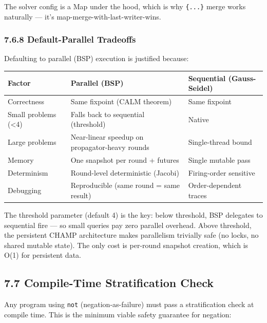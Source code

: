 \documentclass[11pt]{article}
\begin{document}
The solver config is a Map under the hood, which is why \texttt{\{...\}} merge
works naturally — it's map-merge-with-last-writer-wins.
\subsubsection{7.6.8 Default-Parallel Tradeoffs}
\label{sec:orgcf95be8}

Defaulting to parallel (BSP) execution is justified because:

\begin{center}
\begin{tabular}{lll}
Factor & Parallel (BSP) & Sequential (Gauss-Seidel)\\
\hline
Correctness & Same fixpoint (CALM theorem) & Same fixpoint\\
Small problems (<4) & Falls back to sequential (threshold) & Native\\
Large problems & Near-linear speedup on propagator-heavy rounds & Single-thread bound\\
Memory & One snapshot per round + futures & Single mutable pass\\
Determinism & Round-level deterministic (Jacobi) & Firing-order sensitive\\
Debugging & Reproducible (same round = same result) & Order-dependent traces\\
\end{tabular}
\end{center}

The threshold parameter (default 4) is the key: below threshold, BSP
delegates to sequential fire — so small queries pay zero parallel overhead.
Above threshold, the persistent CHAMP architecture makes parallelism trivially
safe (no locks, no shared mutable state). The only cost is per-round snapshot
creation, which is O(1) for persistent data.
\subsection{7.7 Compile-Time Stratification Check}
\label{sec:org211287f}

Any program using \texttt{not} (negation-as-failure) must pass a stratification check
at compile time. This is the minimum viable safety guarantee for negation:
\end{document}
